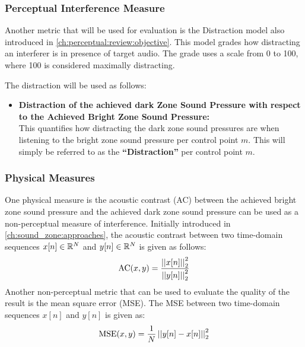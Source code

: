 \subsubsection{Perceptual Interference Measure}
Another metric that will be used for evaluation is the Distraction model also introduced in \autoref{ch:perceptual:review:objective}.
This model grades how distracting an interferer is in presence of target audio.
The grade uses a scale from 0 to 100, where 100 is considered maximally distracting.

The distraction will be used as follows:
\begin{itemize}
    \item \textbf{Distraction of the achieved dark Zone Sound Pressure with respect to the Achieved Bright 
        Zone Sound Pressure:}\\
        This quantifies how distracting the dark zone sound pressures are when listening to the bright zone 
        sound pressure per control point $m$. 
        This will simply be referred to as the \textbf{``Distraction''} per control point $m$.
\end{itemize}

\subsubsection{Physical Measures}
One physical measure is the acoustic contrast (AC) between the 
achieved bright zone sound pressure and the achieved dark zone sound pressure can be used as a non-perceptual measure of interference.
Initially introduced in \autoref{ch:sound_zone:approaches}, 
the acoustic contrast between two time-domain sequences $x[n]\in\mathbb{R}^{N}$
and $y[n]\in\mathbb{R}^{N}$ is given as follows: 
\begin{equation}
    \mathrm{AC}(x,y) = \frac{\norm[2][2]{x[n]}}{\norm[2][2]{y[n]}} 
\end{equation}
Another non-perceptual metric that can be used to evaluate the quality of the result is the mean square error (MSE).
The MSE between two time-domain sequences $x[n]$ and $y[n]$ is given as:
\begin{equation}
    \text{MSE}(x,y) = \frac{1}{N}\norm[2][2]{y[n] - x[n]} 
\end{equation}

